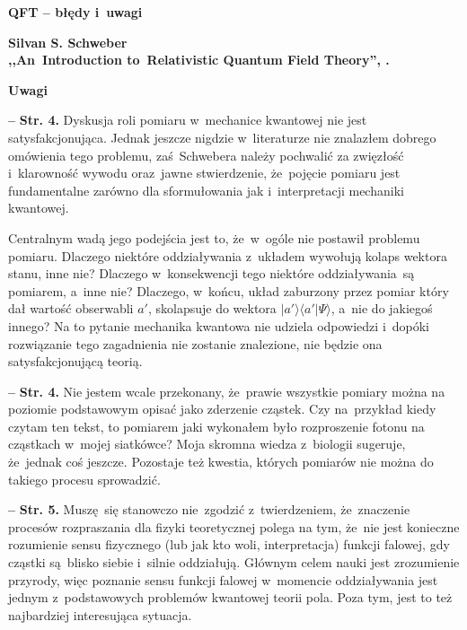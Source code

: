 \documentclass[a4paper,11pt]{article}
\newcommand{\spaceOne}{2em}
\newcommand{\lket}{\langle}
\newcommand{\rket}{\rangle}
\newcommand{\tb}{\textbf}
\newcommand{\noi}{\noindent}
\newcommand{\start}{\noi \tb{--} {}}
\newcommand{\Str}[1]{\tb{Str. #1.}}
\newcommand{\Center}[1]{\begin{center} #1 \end{center}}
\newcommand{\CenterTB}[1]{\Center{\tb{#1}}}
\newcommand{\Field}[1]{ \begin{center} {\Large \tb{#1} } \end{center} }
\newcommand{\Work}[1]{ \begin{center} {\large \tb{#1}} \end{center} }
\begin{document}



\Field{QFT -- błędy i~uwagi}

\vspace{\spaceOne}



\Work{
  Silvan S. Schweber \\
  ,,An~Introduction to~Relativistic Quantum Field Theory'',
  \cite{Sch05}.}


\CenterTB{Uwagi}

\start \Str{4} Dyskusja roli pomiaru w~mechanice kwantowej nie jest
satysfakcjonująca. Jednak jeszcze nigdzie w~literaturze nie znalazłem
dobrego omówienia tego problemu, zaś~Schwebera należy pochwalić za
zwięzłość i~klarowność wywodu oraz~jawne stwierdzenie, że~pojęcie
pomiaru jest fundamentalne zarówno dla sformułowania jak
i~interpretacji mechaniki kwantowej.

Centralnym wadą jego podejścia jest to, że~w~ogóle nie postawił
problemu pomiaru. Dlaczego niektóre oddziaływania z~układem wywołują
kolaps wektora stanu, inne nie? Dlaczego w~konsekwencji tego niektóre
oddziaływania~są pomiarem, a~inne nie? Dlaczego, w~końcu, układ
zaburzony przez pomiar który dał wartość obserwabli $a'$, skolapsuje
do wektora $| a' \rket \lket a' | \Psi \rket$, a~nie do jakiegoś
innego? Na to pytanie mechanika kwantowa nie udziela odpowiedzi
i~dopóki rozwiązanie tego zagadnienia nie zostanie znalezione, nie
będzie ona satysfakcjonującą teorią.

\start \Str{4} Nie jestem wcale przekonany, że~prawie wszystkie
pomiary można na poziomie podstawowym opisać jako zderzenie cząstek.
Czy na~przykład kiedy czytam ten tekst, to pomiarem jaki wykonałem
było rozproszenie fotonu na cząstkach w~mojej siatkówce? Moja skromna
wiedza z~biologii sugeruje, że~jednak coś jeszcze. Pozostaje też
kwestia, których pomiarów nie można do takiego procesu sprowadzić.

\start \Str{5} Muszę~się stanowczo nie~zgodzić z~twierdzeniem,
że~znaczenie procesów rozpraszania dla fizyki teoretycznej polega na
tym, że~nie jest konieczne rozumienie sensu fizycznego (lub jak kto
woli, interpretacja) funkcji falowej, gdy cząstki są~blisko siebie
i~silnie oddziałują. Głównym celem nauki jest zrozumienie przyrody,
więc poznanie sensu funkcji falowej w~momencie oddziaływania jest
jednym z~podstawowych problemów kwantowej teorii pola. Poza tym, jest
to też najbardziej interesująca sytuacja.
\end{document}
